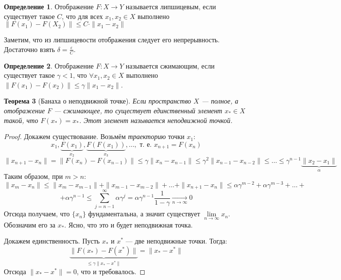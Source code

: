 \documentclass[11pt,openany,a4paper]{scrartcl}
\theoremstyle{plain}
\newtheorem{theorem}{Теорема}[section]
\theoremstyle{definition}
\newtheorem{definition}[theorem]{Определение}
\newcommand{\underto}[1]{\xrightarrow[#1]{}}
\begin{document}
\begin{definition}
    Отображение $F: X \to Y$ называется липшицевым, если существует такое $C$, что
    для всех $x_1, x_2 \in X$ выполнено $\|F(x_1) - F(X_2)\| \leqslant
    C\cdot\|x_1 - x_2\|$
\end{definition}

Заметим, что из липшицевости отображения следует его непрерывность. Достаточно 
взять $\delta = \frac{\varepsilon}{C}$.

\begin{definition}
    Отображение $F: X \to Y$ называется сжимающим, если существует такое
    $\gamma < 1$, что $\forall x_1, x_2 \in X$ выполнено $\|F(x_1) - F(x_2)\|
    \leqslant
    \gamma \|x_1 - x_2\|$.
\end{definition}

\begin{theorem}[Банаха о неподвижной точке]
    Если пространство $X$ — полное, а отображение $F$ — сжимающее, то существует
    единственный элемент $x_\ast \in X$ такой, что $F(x_\ast) = x_\ast$. Этот
    элемент называется неподвижной точкой.
\end{theorem}
\begin{proof}
    Докажем существование. Возьмём \emph{траекторию} точки $x_1$:
    $$
    x_1, \underbrace{F(x_1)}_{x_2}, \underbrace{F(F(x_1))}_{x_3}, \ldots,
    \text{ т. е. } x_{n+1} = F(x_n)
    $$
    $$
    \|x_{n+1} - x_n\| = \|F(x_n) - F(x_{n-1})\| \leqslant \gamma \|x_n - x_{n-1}\|
    \leqslant \gamma^2\|x_{n-1} - x_{n-2}\| \leqslant \ldots \leqslant
    \gamma^{n-1}\underbrace{\|x_2 - x_1\|}_{\alpha}
    $$
    Таким образом, при $m > n$:
    $$
    \|x_m - x_n\| \leqslant \|x_m - x_{m-1}\| + \|x_{m-1} - x_{m-2}\| + \ldots
    + \|x_{n+1} - x_n\| \leqslant \alpha\gamma^{m-2} + \alpha\gamma^{m-3} +\ldots +
    $$
    $$
    + \alpha\gamma^{n-1} \leqslant \sum\limits_{j = n-1}^\infty \alpha\gamma^j =
    \alpha\gamma^{n-1}\frac{1}{1-\gamma} \underto{n \to \infty} 0
    $$
    Отсюда получаем, что $\{x_n\}$ фундаментальна, а значит существует
    $\lim\limits_{n \to \infty} x_n$. Обозначим его за $x_\ast$. Ясно, что это
    и будет неподвижная точка.
    
    Докажем единственность. Пусть $x_\ast$ и $x^\ast$ — две неподвижные точки.
    Тогда:
    $$
    \underbrace{\|F(x_\ast) - F(x^\ast)\|}_{\leqslant \gamma\|x_\ast - x^\ast\|} =
    \|x_\ast - x^\ast\|
    $$
    Отсюда $\|x_\ast - x^\ast\| = 0$, что и требовалось.
\end{proof}
\end{document}
